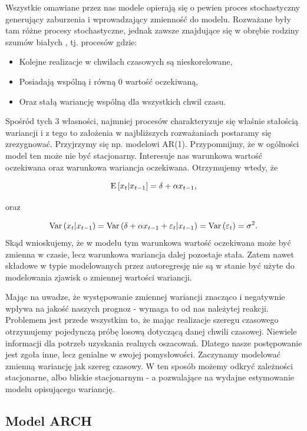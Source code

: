 \documentclass[10pt,a4paper]{book}
\begin{document}
Wszystkie omawiane przez nas modele opierają się o pewien proces stochastyczny generujący zaburzenia i wprowadzający zmienność do modelu. Rozważane były tam różne procesy stochastyczne, jednak zawsze znajdujące się w obrębie rodziny szumów białych , tj. procesów gdzie:
\begin{itemize}
\item Kolejne realizacje w chwilach czasowych są nieskorelowane,
\item Posiadają wspólną i równą 0 wartość oczekiwaną,
\item Oraz stałą wariancję wspólną dla wszystkich chwil czasu.
\end{itemize}
Spośród tych 3 własności, najmniej procesów charakteryzuje się właśnie stałością wariancji i z tego to założenia w najbliższych rozważaniach postaramy się zrezygnować. Przyjrzymy się np. modelowi AR(1). Przypomnijmy, że w ogólności model ten może nie być stacjonarny. Interesuje nas warunkowa wartość oczekiwana oraz warunkowa wariancja oczekiwana. Otrzymujemy wtedy, że 

$$
\operatorname{E} \left[ {x_t} \middle| {x_{t-1}} \right] = \delta + \alpha x_{t-1},
$$

oraz

$$
\operatorname{Var} \left( {x_t | x_{t-1}} \right) = \operatorname{Var} \left( { \delta + \alpha x_{t-1} + \varepsilon_t | x_{t-1}} \right) = \operatorname{Var} \left( {\varepsilon_t} \right) = \sigma^2.
$$
Skąd wnioskujemy, że w modelu tym warunkowa wartość oczekiwana może być zmienna w czasie, lecz warunkowa wariancja dalej pozostaje stała. Zatem nawet składowe w typie modelowanych przez autoregresję nie są w stanie być użyte do modelowania zjawisk o zmiennej wartości wariancji. 

Mając na uwadze, że występowanie zmiennej wariancji znacząco i negatywnie wpływa na jakość naszych prognoz - wymaga to od nas należytej reakcji. Problemem jest przede wszystkim to, że mając realizacje szeregu czasowego otrzymujemy pojedynczą próbę losową dotyczącą danej chwili czasowej. Niewiele informacji dla potrzeb uzyskania realnych oszacowań. Dlatego nasze postępowanie jest zgoła inne, lecz genialne w swojej pomysłowości. Zaczynamy modelować zmienną wariancję jak szereg czasowy. W ten sposób możemy odkryć zależności stacjonarne, albo bliskie stacjonarnym - a pozwalające na wydajne estymowanie modelu opisującego wariancję.

\subsection{Model ARCH}
\end{document}
